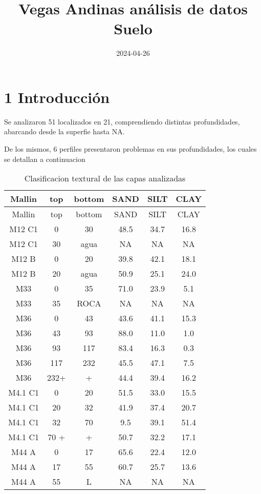 \documentclass[
]{article}
\title{Vegas Andinas análisis de datos Suelo}
\author{}
\date{\vspace{-2.5em}2024-04-26}
\begin{document}
\maketitle

\hypertarget{introducciuxf3n}{%
\section{1 Introducción}\label{introducciuxf3n}}

Se analizaron 51 localizados en 21, comprendiendo distintas
profundidades, abarcando desde la superfie hasta NA.

De los mismos, 6 perfiles presentaron problemas en sus profundidades,
los cuales se detallan a continuacion

\begin{longtable}[]{@{}cccccc@{}}
\caption{Clasificacion textural de las capas analizadas}\tabularnewline
\toprule\noalign{}
Mallin & top & bottom & SAND & SILT & CLAY \\
\midrule\noalign{}
\endfirsthead
\toprule\noalign{}
Mallin & top & bottom & SAND & SILT & CLAY \\
\midrule\noalign{}
\endhead
\bottomrule\noalign{}
\endlastfoot
M12 C1 & 0 & 30 & 48.5 & 34.7 & 16.8 \\
M12 C1 & 30 & agua & NA & NA & NA \\
M12 B & 0 & 20 & 39.8 & 42.1 & 18.1 \\
M12 B & 20 & agua & 50.9 & 25.1 & 24.0 \\
M33 & 0 & 35 & 71.0 & 23.9 & 5.1 \\
M33 & 35 & ROCA & NA & NA & NA \\
M36 & 0 & 43 & 43.6 & 41.1 & 15.3 \\
M36 & 43 & 93 & 88.0 & 11.0 & 1.0 \\
M36 & 93 & 117 & 83.4 & 16.3 & 0.3 \\
M36 & 117 & 232 & 45.5 & 47.1 & 7.5 \\
M36 & 232+ & + & 44.4 & 39.4 & 16.2 \\
M4.1 C1 & 0 & 20 & 51.5 & 33.0 & 15.5 \\
M4.1 C1 & 20 & 32 & 41.9 & 37.4 & 20.7 \\
M4.1 C1 & 32 & 70 & 9.5 & 39.1 & 51.4 \\
M4.1 C1 & 70 + & + & 50.7 & 32.2 & 17.1 \\
M44 A & 0 & 17 & 65.6 & 22.4 & 12.0 \\
M44 A & 17 & 55 & 60.7 & 25.7 & 13.6 \\
M44 A & 55 & L & NA & NA & NA \\
\end{longtable}
\end{document}
